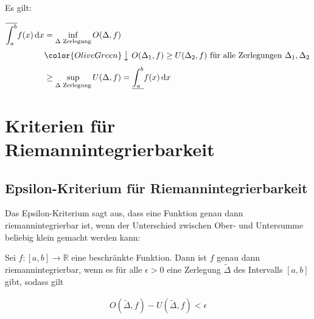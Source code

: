 \documentclass[fontsize=9pt,
               parskip=half-,
               DIV=14,
               listof=chapterentry,
               tocflat]{scrbook}
\begin{document}
\begin{proof*}
Es gilt:

\begin{align*}
{\overline {\int _{a}^{b}}}f(x)\,\mathrm {d} x&=\inf _{\Delta {\text{ Zerlegung}}}O(\Delta ,f)\\[0.3em]&{\color {OliveGreen}\left\downarrow \ O(\Delta _{1},f)\geq U(\Delta _{2},f){\text{ für alle Zerlegungen }}\Delta _{1},\Delta _{2}\right.}\\[0.3em]&\geq \sup _{\Delta {\text{ Zerlegung}}}U(\Delta ,f)={\underline {\int _{a}^{b}}}f(x)\,\mathrm {d} x
\end{align*}

\end{proof*}

\section{Kriterien für Riemannintegrierbarkeit}

\subsection{Epsilon-Kriterium für Riemannintegrierbarkeit}

Das Epsilon-Kriterium sagt aus, dass eine Funktion genau dann riemannintegrierbar ist, wenn der Unterschied zwischen Ober- und Untersumme beliebig klein gemacht werden kann:

\begin{theorem*}
Sei $f:[a,b]\to \mathbb {R} $ eine beschränkte Funktion. Dann ist $f$ genau dann riemannintegrierbar, wenn es für alle $\epsilon >0$ eine Zerlegung ${\tilde {\Delta }}$ des Intervalls $[a,b]$ gibt, sodass gilt

\begin{align*}
O({\tilde {\Delta }},f)-U({\tilde {\Delta }},f)<\epsilon 
\end{align*}

\end{theorem*}
\end{document}
